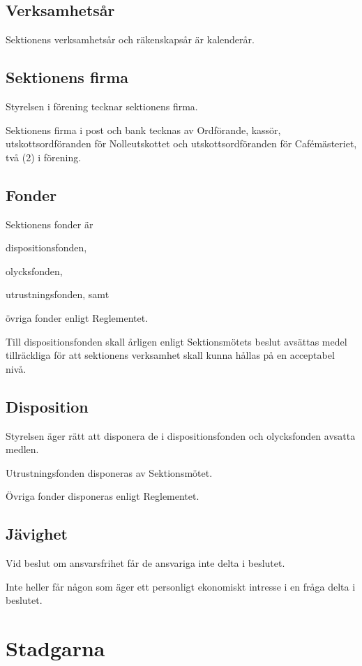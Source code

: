 \documentclass[10pt]{article}
\begin{document}
\subsection{Verksamhetsår}
Sektionens verksamhetsår och räkenskapsår är kalenderår.

\subsection{Sektionens firma}
Styrelsen i förening tecknar sektionens firma.

Sektionens firma i post och bank tecknas av Ordförande, kassör,
utskottsordföranden för Nolleutskottet och utskottsordföranden för
Cafémästeriet, två (2) i förening.

\subsection{Fonder}
Sektionens fonder är
\begin{alphlist}
\item dispositionsfonden,
\item olycksfonden,
\item utrustningsfonden, samt
\item övriga fonder enligt Reglementet.
\end{alphlist}

Till dispositionsfonden skall årligen enligt Sektionsmötets beslut avsättas
medel tillräckliga för att sektionens verksamhet skall kunna hållas på en
acceptabel nivå.

\subsection{Disposition}
Styrelsen äger rätt att disponera de i dispositionsfonden och olycksfonden
avsatta medlen.

Utrustningsfonden disponeras av Sektionsmötet.

Övriga fonder disponeras enligt Reglementet.

\subsection{Jävighet}
Vid beslut om ansvarsfrihet får de ansvariga inte delta i beslutet.

Inte heller får någon som äger ett personligt ekonomiskt intresse i en
fråga delta i beslutet.
\newpage

\section{Stadgarna}
\end{document}
